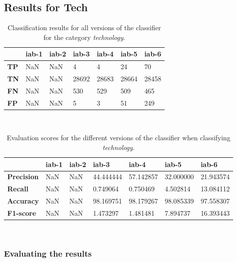 \subsection{Results for Tech}

\begin{table}[h]
\centering
\renewcommand{\arraystretch}{1.25}
\begin{tabularx}{\textwidth}{l|  X|X|X|X|X|X }
         & {\bf iab-1} & {\bf iab-2} & {\bf iab-3} & {\bf iab-4} & {\bf iab-5} & {\bf iab-6} \\ \hline
{\bf TP} & NaN              & NaN           & 4           & 4           & 24          & 70          \\ \hline
{\bf TN} & NaN              & NaN           & 28692       & 28683       & 28664       & 28458       \\ \hline
{\bf FN} & NaN              & NaN           & 530         & 529         & 509         & 465         \\ \hline
{\bf FP} & NaN              & NaN           & 5           & 3           & 51          & 249         \\
\end{tabularx}
\\[10pt]
\caption[Classification results for \emph{technology}]{Classification results for all versions of the classifier for the category \emph{technology}.}
\label{tab:iabresults_technology}
\end{table}

\begin{table}[h]
\centering
\renewcommand{\arraystretch}{1.25}
\begin{tabularx}{\textwidth}{l|  X|X|X|X|X|X }
                & {\bf iab-1} & {\bf iab-2} & {\bf iab-3} & {\bf iab-4} & {\bf iab-5} & {\bf iab-6} \\ \hline
{\bf Precision} & NaN         & NaN         & 44.444444   & 57.142857   & 32.000000   & 21.943574   \\ \hline
{\bf Recall}    & NaN         & NaN         & 0.749064    & 0.750469    & 4.502814    & 13.084112   \\ \hline
{\bf Accuracy}  & NaN         & NaN         & 98.169751   & 98.179267   & 98.085339   & 97.558307   \\ \hline
{\bf F1-score}  & NaN         & NaN         & 1.473297    & 1.481481    & 7.894737    & 16.393443   \\
\end{tabularx}
\\[10pt]
\caption[Evaluation scores for \emph{technology}]{Evaluation scores for the different versions of the classifier when classifying \emph{technology}.}
\label{tab:precision_technology}
\end{table}


\subsubsection{Evaluating the results}